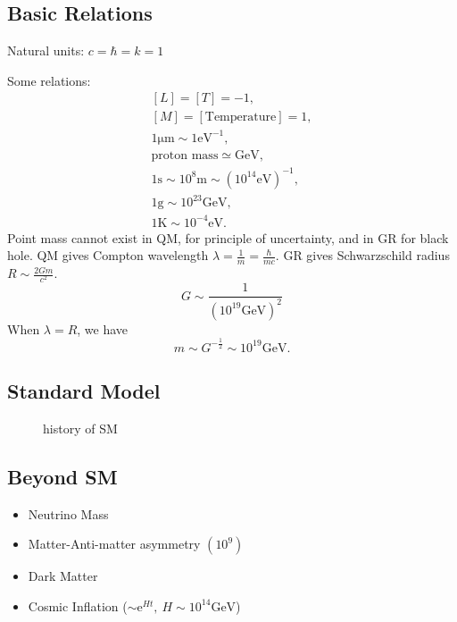 \subsection{Basic Relations}
Natural units: $c=\hbar =k =1$

Some relations:
\begin{equation}
  \begin{gathered}
    \left[ L \right] = \left[ T \right] = -1, \\
    \left[ M \right] = \left[ \text{Temperature} \right] = 1, \\
    1 \mathrm{\mu m} \sim 1 \mathrm{eV}^{-1}, \\
    \text{proton mass} \simeq \mathrm{GeV}, \\
    1\mathrm{s} \sim 10^{8} \mathrm{m} \sim \left( 10^{14} \mathrm{eV}\right)^{-1}, \\
    1 \mathrm{g} \sim 10^{23} \mathrm{GeV} ,\\
    1 \mathrm{K} \sim 10^{-4} \mathrm{eV} .
  \end{gathered}
\end{equation}
Point mass cannot exist in QM, for principle of uncertainty, and in GR for black hole.
QM gives Compton wavelength $\lambda = \frac{1}{m} = \frac{\hbar }{mc} $. GR gives Schwarzschild radius $R \sim \frac{2Gm}{c^{2}}$.
\begin{equation}
  G \sim \frac{1}{\left( 10^{19} \mathrm{GeV} \right)^{2}}
\end{equation}
When $\lambda = R$, we have
\begin{equation}
  m \sim G^{-\frac{1}{2}} \sim 10^{19} \mathrm{GeV}.
\end{equation}

\subsection{Standard Model}

\begin{figure}[ht]
    \centering
    \caption{history of SM}
    \label{fig:history-of-sm}
\end{figure}

\subsection{Beyond SM}
\begin{itemize}
  \item Neutrino Mass
  \item Matter-Anti-matter asymmetry $(10^{9})$
  \item Dark Matter
  \item Cosmic Inflation ($\sim \mathrm{e}^{Ht}, \ H \sim 10^{14}\mathrm{GeV}$)
\end{itemize}


